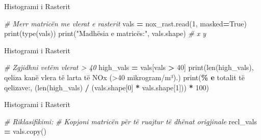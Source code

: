 \documentclass[
  ignorenonframetext,
]{beamer}
\newenvironment{Shaded}{\begin{snugshade}}{\end{snugshade}}
\newcommand{\BuiltInTok}[1]{#1}
\newcommand{\CommentTok}[1]{\textcolor[rgb]{0.56,0.35,0.01}{\textit{#1}}}
\newcommand{\DecValTok}[1]{\textcolor[rgb]{0.00,0.00,0.81}{#1}}
\newcommand{\NormalTok}[1]{#1}
\newcommand{\OperatorTok}[1]{\textcolor[rgb]{0.81,0.36,0.00}{\textbf{#1}}}
\newcommand{\SpecialCharTok}[1]{\textcolor[rgb]{0.81,0.36,0.00}{\textbf{#1}}}
\newcommand{\StringTok}[1]{\textcolor[rgb]{0.31,0.60,0.02}{#1}}
\newcommand{\VariableTok}[1]{\textcolor[rgb]{0.00,0.00,0.00}{#1}}
\begin{document}
\begin{frame}[fragile]{Histogrami i Rasterit}
\protect\hypertarget{histogrami-i-rasterit-2}{}

\begin{Shaded}
\begin{Highlighting}[]
\CommentTok{\# Merr matricën me vlerat e rasterit}
\NormalTok{vals }\OperatorTok{=}\NormalTok{ nox\_rast.read(}\DecValTok{1}\NormalTok{, masked}\OperatorTok{=}\VariableTok{True}\NormalTok{)}
\BuiltInTok{print}\NormalTok{(}\BuiltInTok{type}\NormalTok{(vals))}
\BuiltInTok{print}\NormalTok{(}\StringTok{"Madhësia e matricës:"}\NormalTok{, vals.shape)  }\CommentTok{\# x y}
\end{Highlighting}
\end{Shaded}
\end{frame}

\begin{frame}[fragile]{Histogrami i Rasterit}
\protect\hypertarget{histogrami-i-rasterit-3}{}

\begin{Shaded}
\begin{Highlighting}[]
\CommentTok{\# Zgjidhni vetëm vlerat \textgreater{} 40}
\NormalTok{high\_vals }\OperatorTok{=}\NormalTok{ vals[vals }\OperatorTok{\textgreater{}} \DecValTok{40}\NormalTok{]}
\BuiltInTok{print}\NormalTok{(}\BuiltInTok{len}\NormalTok{(high\_vals), }\StringTok{\textquotesingle{}qeliza kanë vlera të larta të NOx (\textgreater{}40 mikrogram/m³).\textquotesingle{}}\NormalTok{)}
\BuiltInTok{print}\NormalTok{(}\StringTok{\textquotesingle{}}\SpecialCharTok{\% e}\StringTok{ totalit të qelizave:\textquotesingle{}}\NormalTok{, (}\BuiltInTok{len}\NormalTok{(high\_vals) }\OperatorTok{/}\NormalTok{ (vals.shape[}\DecValTok{0}\NormalTok{] }\OperatorTok{*}\NormalTok{ vals.shape[}\DecValTok{1}\NormalTok{])) }\OperatorTok{*} \DecValTok{100}\NormalTok{)}
\end{Highlighting}
\end{Shaded}
\end{frame}

\begin{frame}[fragile]{Histogrami i Rasterit}
\protect\hypertarget{histogrami-i-rasterit-4}{}

\begin{Shaded}
\begin{Highlighting}[]
\CommentTok{\# Riklasifikimi:}
\CommentTok{\# Kopjoni matricën për të ruajtur të dhënat origjinale}
\NormalTok{recl\_vals }\OperatorTok{=}\NormalTok{ vals.copy()}
\end{Highlighting}
\end{Shaded}
\end{frame}
\end{document}
